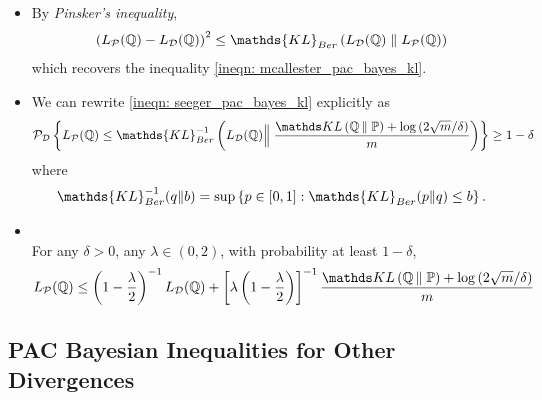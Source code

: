 \documentclass[11pt]{article}
\begin{document}
\begin{itemize}
\item \begin{remark}
By \emph{Pinsker's inequality},
\begin{align*}
\paren{L_{\cP}(\bQ) - L_{\cD}(\bQ) }^2  \le  \mathds{KL}_{Ber}\paren{L_{\cD}(\bQ) \;\|\; L_{\cP}(\bQ)} 
\end{align*} which recovers the inequality \eqref{ineqn: mcallester_pac_bayes_kl}.
\end{remark}

\item \begin{remark}
We can rewrite \eqref{ineqn: seeger_pac_bayes_kl} explicitly as
\begin{align}
\cP_{\cD}\set{L_{\cP}(\bQ) \le \mathds{KL}_{Ber}^{-1}\paren{L_{\cD}(\bQ) \Bigr\|\; \frac{\kl{\bQ}{\bP} + \log\paren{2\sqrt{m}/\delta}}{m}}} \ge 1 - \delta  \label{ineqn: seeger_pac_bayes_kl_2}
\end{align} where 
\begin{align*}
 \mathds{KL}_{Ber}^{-1}(q \| b) = \sup\set{p \in [0, 1]: \mathds{KL}_{Ber}(p \| q) \le b}.
\end{align*}
\end{remark}

\item \begin{corollary}\citep{alquier2021user}\\
For any $\delta >0$, any $\lambda \in (0, 2)$, with probability at least $1- \delta$,
\begin{align}
L_{\cP}(\bQ) \le \paren{1 - \frac{\lambda}{2}}^{-1}L_{\cD}(\bQ) + \brac{\lambda\paren{1 - \frac{\lambda}{2}}}^{-1}\frac{\kl{\bQ}{\bP} + \log\paren{2\sqrt{m}/\delta}}{m} \label{ineqn: seeger_pac_bayes_kl_modified}
\end{align}
\end{corollary}
\end{itemize}
\subsection{PAC Bayesian Inequalities for Other Divergences}





\newpage


\end{document}
